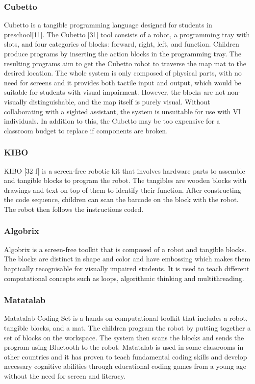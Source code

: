 \documentclass[oneside,%
                    author={Malak Hajji},
                    degree={BSc},
                    title={Designing An Accessible Computational Toolkit For Students},
                  subtitle={With Mixed Visual Abilities}]{dissertation}
\begin{document}
\subsubsection{Cubetto}
Cubetto is a tangible programming language designed for students in preschool[11]. The Cubetto [31] tool consists of a robot, a programming tray with slots, and four categories of blocks: forward, right, left, and function. Children produce programs by inserting the action blocks in the programming tray. The resulting programs aim to get the Cubetto robot to traverse the map mat to the desired location. The whole system is only composed of physical parts, with no need for screens and it provides both tactile input and output, which would be suitable for students with visual impairment. However, the blocks are not non-visually distinguishable, and the map itself is purely visual. Without collaborating with a sighted assistant, the system is unsuitable for use with VI individuals. In addition to this, the Cubetto may be too expensive for a classroom budget to replace if components are broken.  

\subsubsection{KIBO}
KIBO [32 f] is a screen-free robotic kit that involves hardware parts to assemble and tangible blocks to program the robot. The tangibles are wooden blocks with drawings and text on top of them to identify their function. After constructing the code sequence, children can scan the barcode on the block with the robot. The robot then follows the instructions coded.  

\subsubsection{Algobrix}
Algobrix is a screen-free toolkit that is composed of a robot and tangible blocks. The blocks are distinct in shape and color and have embossing which makes them haptically recognisable for visually impaired students. It is used to teach different computational concepts such as loops, algorithmic thinking and multithreading. 

\subsubsection{Matatalab}
Matatalab Coding Set is a hands-on computational toolkit that includes a robot, tangible blocks, and a mat. The children program the robot by putting together a set of blocks on the workspace. The system then scans the blocks and sends the program using Bluetooth to the robot. Matatalab is used in some classrooms in other countries and it has proven to teach fundamental coding skills and develop necessary cognitive abilities through educational coding games from a young age without the need for screen and literacy. 
\end{document}
